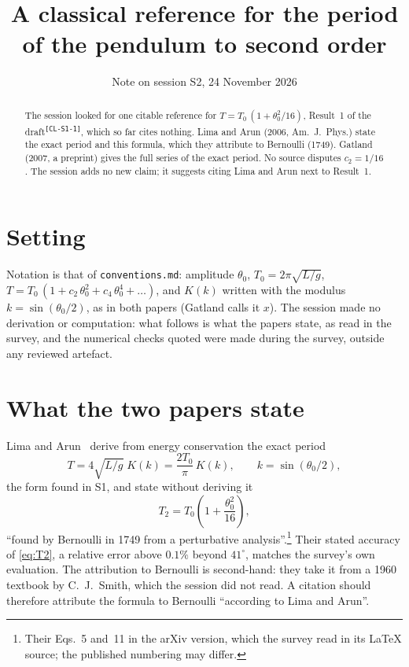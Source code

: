\documentclass[11pt]{article}
\title{A classical reference for the period of the pendulum to second order}
\author{Note on session S2, 24 November 2026}
\date{}
\newcommand{\card}[1]{\textsuperscript{\texttt{[#1]}}}
\begin{document}
\maketitle

\begin{abstract}
The session looked for one citable reference for
$T = T_0\,(1 + \theta_0^2/16)$, Result~1 of the draft\card{CL-S1-1}, which
so far cites nothing. Lima and Arun (2006, Am.\ J.\ Phys.) state the exact
period and this formula, which they attribute to Bernoulli (1749). Gatland
(2007, a preprint) gives the full series of the exact period. No source
disputes $c_2 = 1/16$. The session adds no new claim; it suggests citing Lima
and Arun next to Result~1.
\end{abstract}

\section*{Setting}
Notation is that of \texttt{conventions.md}: amplitude $\theta_0$,
$T_0 = 2\pi\sqrt{L/g}$, $T = T_0\,(1 + c_2\,\theta_0^2 + c_4\,\theta_0^4 +
\dots)$, and $K(k)$ written with the modulus $k = \sin(\theta_0/2)$, as in
both papers (Gatland calls it $x$). The session made no derivation or
computation: what follows is what the papers state, as read in the survey, and
the numerical checks quoted were made during the survey, outside any reviewed
artefact.

\section{What the two papers state}
Lima and Arun~\cite{lima2006} derive from energy conservation the exact period
\begin{equation}
  T = 4\sqrt{L/g}\;K(k) = \frac{2T_0}{\pi}\,K(k), \qquad k = \sin(\theta_0/2),
  \label{eq:exact}
\end{equation}
the form found in S1, and state without deriving it
\begin{equation}
  T_2 = T_0\left(1 + \frac{\theta_0^2}{16}\right),
  \label{eq:T2}
\end{equation}
``found by Bernoulli in 1749 from a perturbative analysis''.\footnote{Their
Eqs.~5 and~11 in the arXiv version, which the survey read in its LaTeX source;
the published numbering may differ.} Their stated accuracy of
\eqref{eq:T2}, a relative error above $0.1\%$ beyond $41^\circ$, matches the
survey's own evaluation. The attribution to Bernoulli is second-hand:
they take it from a 1960 textbook by C.~J.~Smith, which the session did not
read. A citation should therefore attribute the formula to Bernoulli
``according to Lima and Arun''.
\end{document}
